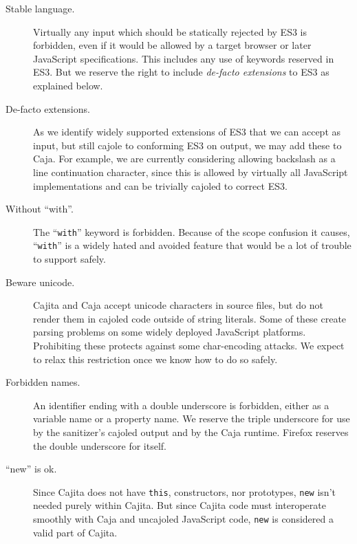 \documentclass[letterpaper,twocolumn,10pt]{article}
\newcommand{\code}[1]{{\tt {#1}}}              %
\begin{document}
\begin{description}

    \item[Stable language.] Virtually any input which should be statically 
    rejected by ES3 is forbidden, even if it would be allowed by a target 
    browser or later JavaScript specifications. This includes any use of 
    keywords reserved in ES3. But we reserve the right to include 
    \emph{de-facto extensions} to ES3 as explained below.
    
    \item[De-facto extensions.] As we identify widely supported extensions of 
    ES3 that we can accept as input, but still cajole to conforming ES3 on 
    output, we may add these to Caja. For example, we are currently 
    considering allowing backslash as a line continuation character, since 
    this is allowed by virtually all JavaScript implementations and can be 
    trivially cajoled to correct ES3.

    \item[Without ``with''.] The ``\code{with}'' keyword is forbidden. 
    Because of the scope confusion it causes, ``\code{with}'' is a widely 
    hated and avoided feature that would be a lot of trouble to support 
    safely.

    \item[Beware unicode.] Cajita and Caja accept unicode characters in source files, but do not render
    them in cajoled code outside of string literals. Some of these create parsing 
    problems on some widely deployed JavaScript platforms. Prohibiting these 
    protects against some char-encoding attacks. We expect to relax this 
    restriction once we know how to do so safely.

    \item[Forbidden names.] An identifier ending with a double underscore is 
    forbidden, either as a variable name or a property name. We reserve the 
    triple underscore for use by the sanitizer's cajoled output and by the 
    Caja runtime. Firefox reserves the double underscore for itself.
    
    \item[``new'' is ok.] Since Cajita does not have \code{this}, 
    constructors, nor prototypes, \code{new} isn't needed purely within 
    Cajita. But since Cajita code must interoperate smoothly with Caja and 
    uncajoled JavaScript code, \code{new} is considered a valid part of 
    Cajita.
        
\end{description}
\end{document}

